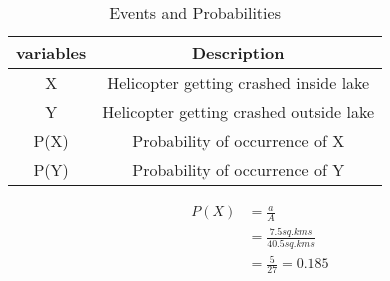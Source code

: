 \documentclass[11pt,a4paper,twocolumn]{article}
\begin{document}
\begin{table}[h!]
    \label{Table-2}
    \caption{Events and Probabilities}
    \centering
    \begin{tabular}{|c|c|}
    \hline
        variables & Description\\
        \hline
        X&Helicopter getting crashed inside lake\\
        \hline
        Y&Helicopter getting crashed outside lake\\
        \hline
        P(X)&Probability of occurrence of X\\
        \hline
        P(Y)&Probability of occurrence of Y\\
        \hline
        \end{tabular}
        \label{tab:my_label}
\end{table}
\begin{align}
    P(X)&=\frac{a}{A}\\
    &=\frac{7.5sq.kms}{40.5sq.kms}\\
    &=\frac{5}{27}=0.185
\end{align}

\end{document}
